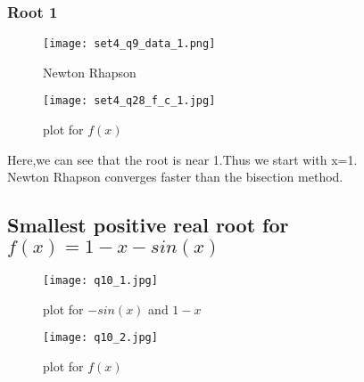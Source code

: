\documentclass[a4paper]{article}
\begin{document}
        \subsubsection{Root 1}
            \begin{figure}[!htbp]
              \centering
              \begin{minipage}[b]{0.45\textwidth}
\texttt{[image: set4\_q9\_data\_1.png]}
                \caption{Newton Rhapson }
              \end{minipage}
              \hfill
              \begin{minipage}[b]{0.45\textwidth}
                \texttt{[image: set4\_q28\_f\_c\_1.jpg]}
                \caption{plot for $f(x)$}
              \end{minipage}
            \end{figure}
            \Large{Here,we can see that the root is near 1.Thus we start with x=1.\\Newton Rhapson converges faster than the bisection method.}
            \newpage
            
            \subsection{Smallest positive real root for $f(x)=1-x-sin(x)$}
            \begin{figure}[!htbp]
              \centering
              \begin{minipage}[b]{0.45\textwidth}
                \texttt{[image: q10\_1.jpg]}
               
                 \caption{plot for $-sin(x)$ and $ 1-x$ }
              \end{minipage}
              \hfill
              \begin{minipage}[b]{0.45\textwidth}
                \texttt{[image: q10\_2.jpg]}
                \caption{plot for $f(x)$}
              \end{minipage}
            \end{figure}
\end{document}
